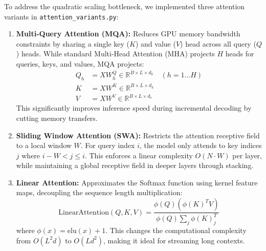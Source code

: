 \documentclass[11pt,a4paper]{article}
\begin{document}
To address the quadratic scaling bottleneck, we implemented three attention variants in \texttt{attention\_variants.py}:
\begin{enumerate}
    \item \textbf{Multi-Query Attention (MQA):} Reduces GPU memory bandwidth constraints by sharing a single key ($K$) and value ($V$) head across all query ($Q$) heads. While standard Multi-Head Attention (MHA) projects $H$ heads for queries, keys, and values, MQA projects:
    \begin{align}
    Q_h &= X W_h^Q \in \mathbb{R}^{B \times L \times d_k} \quad (h=1 \dots H) \\
    K &= X W^K \in \mathbb{R}^{B \times L \times d_k} \\
    V &= X W^V \in \mathbb{R}^{B \times L \times d_v}
    \end{align}
    This significantly improves inference speed during incremental decoding by cutting memory transfers.
    \item \textbf{Sliding Window Attention (SWA):} Restricts the attention receptive field to a local window $W$. For query index $i$, the model only attends to key indices $j$ where $i - W < j \le i$. This enforces a linear complexity $O(N \cdot W)$ per layer, while maintaining a global receptive field in deeper layers through stacking.
    \item \textbf{Linear Attention:} Approximates the Softmax function using kernel feature maps, decoupling the sequence length multiplication:
    \begin{equation}
    \text{LinearAttention}(Q, K, V) = \frac{\phi(Q) (\phi(K)^T V)}{\phi(Q) \sum_j \phi(K)_j^T}
    \end{equation}
    where $\phi(x) = \text{elu}(x) + 1$. This changes the computational complexity from $O(L^2 d)$ to $O(L d^2)$, making it ideal for streaming long contexts.
\end{enumerate}
\end{document}
